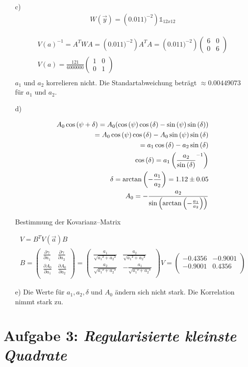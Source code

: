\begin{itemize}
\item[c)]
\begin{align*}
W(\vec{y}) = \left(0.011)^{-2}\right)\mathds{1}_{12x12}
\end{align*}

\begin{align*}
V(a)^{-1} = A^{T}WA= \left(0.011)^{-2}\right) A^{T}A = \left(0.011)^{-2}\right) \begin{pmatrix}
6 & 0\\
0 & 6
\end{pmatrix}\\
V(a) = \frac{121}{6000000}
\begin{pmatrix}
1 & 0\\
0 & 1
\end{pmatrix}\\
\end{align*}
$a_1$ und $a_2$ korrelieren nicht. Die Standartabweichung beträgt $\approx 0.00449073$ für $a_1$ und $a_2$.

\item[d)]

\begin{align*}
A_0\cos{(\psi+\delta)} = A_0(\cos{(\psi)}\cos{(\delta)}- \sin{(\psi)}\sin{(\delta)})\\
=A_0\cos{(\psi)}\cos{(\delta)}- A_0\sin{(\psi)}\sin{(\delta)}\\
=a_1\cos{(\delta)}- a_2\sin{(\delta)}\\
\cos{(\delta)} = a_1\left(\-\frac{a_2}{\sin{(\delta)}}^{-1}\right)\\
\delta = \arctan{\left(-\frac{a_1}{a_2}\right)} = 1.12\pm 0.05\\
A_0=-\frac{a_2}{\sin{\left(\arctan{\left(-\frac{a_1}{a_2}\right)}\right)}}
\end{align*}

Bestimmung der Kovarianz--Matrix

\begin{align*}
V = B^{T}V(\vec{a})B \\
B = 
\begin{pmatrix}
\frac{\partial \gamma}{\partial a_1}& \frac{\partial \gamma}{\partial a_2} \\
\frac{\partial A_0}{\partial a_1} & \frac{\partial A_0}{\partial a_2}\\
\end{pmatrix}
=
\begin{pmatrix}
\frac{a_1}{\sqrt{{a_1}²+{a_2}²}} & \frac{a_2}{\sqrt{{a_1}²+{a_2}²}} \\
\frac{a_2}{\sqrt{{a_1}²+{a_2}²}} & -\frac{a_1}{\sqrt{{a_1}²+{a_2}²}}\\
\end{pmatrix}
V = 
\begin{pmatrix}
-0.4356 & -0.9001\\
-0.9001 & 0.4356\\
\end{pmatrix}
\end{align*}
\item[e)]
Die Werte für $a_1,a_2,\delta$ und $A_0$ ändern sich nicht stark. Die Korrelation nimmt stark zu.
\end{itemize}
\section*{Aufgabe 3: \emph{Regularisierte kleinste Quadrate}}

